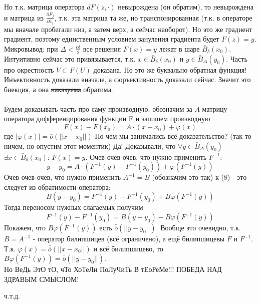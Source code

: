 \documentclass[book, 11pt]{report}
\begin{document}
Но т.к. матрица оператора $dF(z,\cdot)$ невырождена (он обратим), то невырождена и матрица из $\frac{\partial F_j}{\partial x_i}$, т.к. эта матрица та же, но транспонированная (т.к. в операторе мы вначале пробегали низ, а затем верх, а сейчас наоборот). Но это же градиент градиент, поэтому единственным условием зануления градиента будет $F(z)=y$. \\ Микровывод: при $\Delta<\frac{c\delta}{2}$ все решения $F(x)=y$ лежат в шаре $\bar{B}_\delta(x_0)$. Интуитивно сейчас это привязывается, т.к. $x\in\bar{B}_\delta(x_0)$ и $y\in\bar{B}_\Delta(y_0)$. Часть про окрестность $V\subset F(U)$ доказана. Но это же буквально обратная функция! Инъективность доказали вначале, а сюръективность доказали сейчас. Значит это биекция, а она \sout{наказуема} обратима.\\ \\
Будем доказывать часть про саму производную: обозначим за $A$ матрицу оператора дифференцирования функции F и запишем производную
\begin{equation}
    F(x)-F(x_0)=A\cdot(x-x_0)+\varphi(x)
\end{equation}
где $|\varphi(x)|=\bar{\bar{o}}(||x-x_0||)$
Но чем мы занимались всё доказательство? (так-то ничем, но опустим этот моментик) Да! Доказывали, что $\forall y\in\bar{B}_\Delta(y_0)$ $\exists x\in\bar{B}_\delta(x_0)$: $F(x)=y$. Очев-очев-очев, что нужно применить $F^{-1}$:
\begin{equation}
    y-y_0=A\cdot(F^{-1}(y)-F^{-1}(y_0))+\varphi(F^{-1}(y))
\end{equation}
Очев-очев-очев, что нужно применить $A^{-1}=B$ (обозначим это так) к (8) - это следует из обратимости оператора:
\begin{equation}
    B(y-y_0)=F^{-1}(y)-F^{-1}(y_0)+B\varphi(F^{-1}(y))
\end{equation}
Тогда переносом нужных слагаемых получим
\begin{equation}
    F^{-1}(y)-F^{-1}(y_0)= B(y-y_0)-B\varphi(F^{-1}(y))
\end{equation}
Покажем, что $B\varphi(F^{-1}(y))$ есть $\bar{\bar{o}}(||y-y_0||)$. 
Вообще это очевидно, т.к. $B=A^{-1}$ - оператор билипшицев (всё ограничено), а ещё билипшицевы $F$ и $F^{-1}$. Т.к. $\varphi(x)=\bar{\bar{o}}(||x-x_0||)$ и всё билипшицево, то $B\varphi(F^{-1}(y))=\bar{\bar{o}}(||y-y_0||)$.\\ Но ВеДь ЭтО тО, чТо ХоТеЛи ПоЛуЧиТь В тЕоРеМе!!! ПОБЕДА НАД ЗДРАВЫМ СМЫСЛОМ!
\par{{\raggedleft ч.т.д.\par}}
\end{document}
